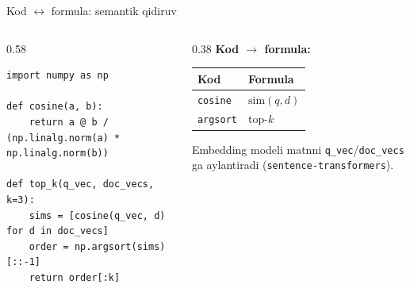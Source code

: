 \documentclass[aspectratio=169,11pt]{beamer}
\begin{document}
\begin{frame}[fragile]{Kod $\leftrightarrow$ formula: semantik qidiruv}
  \begin{columns}[T]
    \begin{column}{0.58\textwidth}
\begin{lstlisting}
import numpy as np

def cosine(a, b):
    return a @ b / (np.linalg.norm(a) * np.linalg.norm(b))

def top_k(q_vec, doc_vecs, k=3):
    sims = [cosine(q_vec, d) for d in doc_vecs]
    order = np.argsort(sims)[::-1]
    return order[:k]
\end{lstlisting}
    \end{column}
    \begin{column}{0.38\textwidth}
      \textbf{Kod $\to$ formula:}\\[3pt]
      \footnotesize
      \begin{tabular}{p{1.7cm}p{2.0cm}}
        \toprule
        Kod & Formula \\
        \midrule
        \texttt{cosine} & $\mathrm{sim}(q,d)$ \\
        \texttt{argsort} & top-$k$ \\
        \bottomrule
      \end{tabular}
      \vspace{4pt}
      \begin{tcolorbox}[okbox,top=2pt,bottom=2pt]
        \footnotesize
        Embedding modeli matnni \texttt{q\_vec}/\texttt{doc\_vecs} ga
        aylantiradi (\texttt{sentence-transformers}).
      \end{tcolorbox}
    \end{column}
  \end{columns}
\end{frame}
\end{document}

